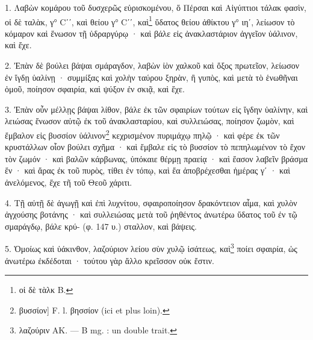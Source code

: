 \documentclass[a4paper, 11pt, oneside, polutonikogreek, french]{article}
\begin{document}
1. Λαβὼν κομάρου τοῦ δυσχερῶς εὑρισκομένου, ὅ Πέρσαι καὶ Αἰγύπτιοι τάλακ φασὶν, οἱ δὲ ταλὰκ, γ° Cʹʹ, καὶ θείου γ° Cʹʹ, καὶ\footnote{οἱ δὲ τὰλκ B.} ὕδατος θείου ἀθίκτου γ° ιηʹ, λείωσον τὸ κόμαρον καὶ ἕνωσον τῇ ὑδραργύρῳ · καὶ βάλε εἰς ἀνακλαστάριον ἀγγεῖον ὑάλινον, καὶ ἔχε.

2. Ἐπὰν δὲ βούλει βάψαι σμάραγδον, λαβὼν ἰὸν χαλκοῦ καὶ ὄξος πρωτεῖον, λείωσον ἐν ἴγδῃ ὑαλίνῃ · συμμίξας καὶ χολὴν ταύρου ξηρὰν, ἢ γυπὸς, καὶ μετὰ τὸ ἑνωθῆναι ὁμοῦ, ποίησον σφαιρία, καὶ ψύξον ἐν σκιᾷ, καὶ ἔχε.

3. Ἐπὰν οὖν μέλλῃς βάψαι λίθον, βάλε ἐκ τῶν σφαιρίων τούτων εἰς ἴγδην ὑαλίνην, καὶ λειώσας ἕνωσον αὐτῷ ἐκ τοῦ ἀνακλασταρίου, καὶ συλλειώσας, ποίησον ζωμὸν, καὶ ἔμβαλον εἰς βυσσίον ὑάλινον\footnote{βυσσίον] F. l. βησσίον (ici et plus loin).} κεχρισμένον πυριμάχῳ πηλῷ · καὶ φέρε ἐκ τῶν κρυστάλλων οἷον βούλει σχῆμα · καὶ ἔμβαλε εἰς τὸ βυσσίον τὸ πεπηλωμένον τὸ ἔχον τὸν ζωμόν · καὶ βαλῶν κάρβωνας, ὑπόκαιε θέρμῃ πραείᾳ · καὶ ἔασον λαβεῖν βράσμα ἕν · καὶ ἄρας ἐκ τοῦ πυρὸς, τίθει ἐν τόπῳ, καὶ ἔα ἀποβρέχεσθαι ἡμέρας γʹ · καὶ ἀνελόμενος, ἔχε τῆ τοῦ Θεοῦ χάριτι.

4. Τῇ αὐτῇ δὲ ἀγωγῇ καὶ ἐπὶ λυχνίτου, σφαιροποίησον δρακόντειον αἷμα, καὶ χυλὸν ἀγχούσης βοτάνης · καὶ συλλειώσας μετὰ τοῦ ῥηθέντος ἀνωτέρω ὕδατος τοῦ ἐν τῷ σμαράγδῳ, βάλε κρύ- (φ. 147 υ.) σταλλον, καὶ βάψεις.

5. Ὁμοίως καὶ ὑάκινθον, λαζούριον λείου σὺν χυλῷ ἰσάτεως, καὶ\footnote{λαζούριν AK. --- B mg. : un double trait.} ποίει σφαιρία, ὡς ἀνωτέρω ἐκδέδοται · τούτου γὰρ ἄλλο κρεῖσσον οὐκ ἔστιν.
\end{document}
